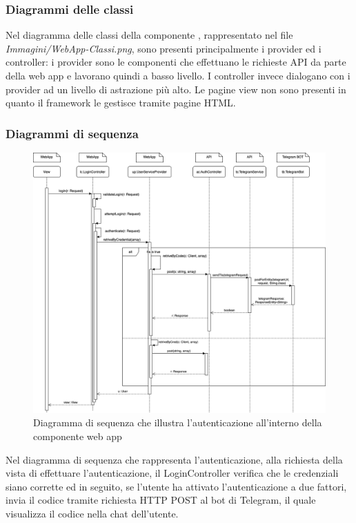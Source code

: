 	\subsubsection{Diagrammi delle classi}%
	Nel diagramma delle classi della componente , rappresentato nel file \textit{Immagini/WebApp-Classi.png}, sono presenti principalmente i provider ed i controller: i provider sono le componenti che effettuano le richieste API da parte della web app e lavorano quindi a basso livello.
	\newline
	I controller invece dialogano con i provider ad un livello di astrazione più alto. Le pagine view non sono presenti in quanto il framework  le gestisce tramite pagine HTML.
	\begin{landscape}
	\subsubsection{Diagrammi di sequenza}%
		\begin{figure}[H]
			\centering
			\includegraphics[scale=0.400]{res/images/WEBAPP/AutenticazioneTfa.png}
			\caption{Diagramma di sequenza che illustra l'autenticazione all'interno della componente web app}
			\label{Diagramma 23}
		\end{figure}
		Nel diagramma di sequenza che rappresenta l'autenticazione, alla richiesta della vista di effettuare l'autenticazione, il LoginController verifica che le credenziali siano corrette ed in seguito, se l'utente ha attivato l'autenticazione a due fattori, invia il codice tramite richiesta HTTP POST al bot di Telegram, il quale visualizza il codice nella chat dell'utente.

\end{landscape}
